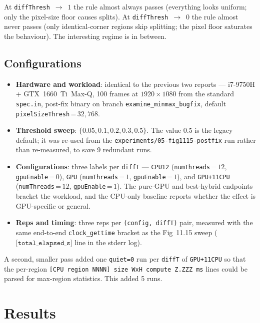 \documentclass[
	english,
	letterpaper, oneside
]{article}
\begin{document}
\noindent
At \texttt{diffThresh}~$\to$~$1$ the rule almost always passes
(everything looks uniform; only the pixel-size floor causes splits).
At \texttt{diffThresh}~$\to$~$0$ the rule almost never passes (only
identical-corner regions skip splitting; the pixel floor saturates the
behaviour). The interesting regime is in between.

\subsection{Configurations}

\begin{itemize}
    \item \textbf{Hardware and workload}: identical to the previous two
    reports --- i7-9750H + GTX~1660~Ti~Max-Q, 100 frames at
    $1920\times1080$ from the standard \texttt{spec.in}, post-fix
    binary on branch \texttt{examine\_minmax\_bugfix}, default
    \texttt{pixelSizeThresh}\,=\,$32{,}768$.
    \item \textbf{Threshold sweep}: $\{0.05, 0.1, 0.2, 0.3, 0.5\}$.
    The value $0.5$ is the legacy default; it was re-used from the
    \texttt{experiments/05-fig1115-postfix} run rather than re-measured, to
    save 9 redundant runs.
    \item \textbf{Configurations}: three labels per \texttt{diffT} ---
    \texttt{CPU12} (\texttt{numThreads}\,=\,$12$, \texttt{gpuEnable}\,=\,$0$),
    \texttt{GPU} (\texttt{numThreads}\,=\,$1$, \texttt{gpuEnable}\,=\,$1$),
    and \texttt{GPU+11CPU} (\texttt{numThreads}\,=\,$12$, \texttt{gpuEnable}\,=\,$1$).
    The pure-GPU and best-hybrid endpoints bracket the workload, and
    the CPU-only baseline reports whether the effect is GPU-specific
    or general.
    \item \textbf{Reps and timing}: three reps per \texttt{(config, diffT)}
    pair, measured with the same end-to-end \texttt{clock\_gettime}
    bracket as the Fig~11.15 sweep ($\texttt{[total\_elapsed\_s]}$ line
    in the stderr log).
\end{itemize}

\noindent
A second, smaller pass added one \texttt{quiet=0} run per
\texttt{diffT} of \texttt{GPU+11CPU} so that the per-region
\texttt{[CPU region NNNN] size WxH compute Z.ZZZ ms} lines could be
parsed for max-region statistics. This added 5 runs.

\section{Results}
\end{document}
